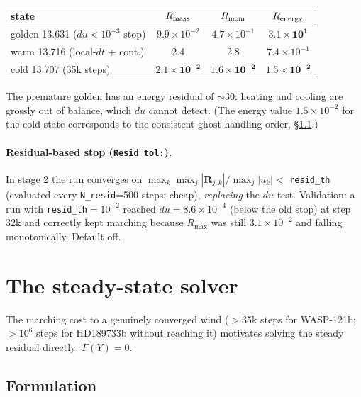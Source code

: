 \documentclass[english,a4paper]{my_memo}
\newcommand{\Rres}{\mathbf{R}}
\newcommand{\code}[1]{\texttt{#1}}
\begin{document}
\begin{center}
\begin{tabular}{lccc}
\toprule
state & $R_{\rm mass}$ & $R_{\rm mom}$ & $R_{\rm energy}$\\
\midrule
golden 13.631 ($du<10^{-3}$ stop) & $9.9\times10^{-2}$ & $4.7\times10^{-1}$
 & $\mathbf{3.1\times10^{1}}$\\
warm 13.716 (local-$dt$ + cont.) & 2.4 & 2.8 & $7.4\times10^{-1}$\\
cold 13.707 (35k steps) & $\mathbf{2.1\times10^{-2}}$ &
 $\mathbf{1.6\times10^{-2}}$ & $\mathbf{1.5\times10^{-2}}$\\
\bottomrule
\end{tabular}
\end{center}

The premature golden has an energy residual of $\sim$30: heating and
cooling are grossly out of balance, which $du$ cannot detect. (The energy
value $1.5\times10^{-2}$ for the cold state corresponds to the consistent
ghost-handling order, \S\ref{sec:newtonres}.)

\paragraph{Residual-based stop (\code{Resid tol:}).} In stage 2 the run
converges on $\max_k \max_j|\Rres_{j,k}|/\max_j|u_k| <$ \code{resid\_th}
(evaluated every \code{N\_resid}=500 steps; cheap), \emph{replacing} the
$du$ test. Validation: a run with \code{resid\_th}$=10^{-2}$ reached
$du=8.6\times10^{-4}$ (below the old stop) at step 32k and correctly kept
marching because $R_{\max}$ was still $3.1\times10^{-2}$ and falling
monotonically. Default off.

\section{The steady-state solver}\label{sec:newton}

The marching cost to a genuinely converged wind ($>$35k steps for
WASP-121b; $>10^6$ steps for HD189733b without reaching it) motivates
solving the steady residual directly: $F(Y)=0$.

\subsection{Formulation}\label{sec:newtonres}
\end{document}
